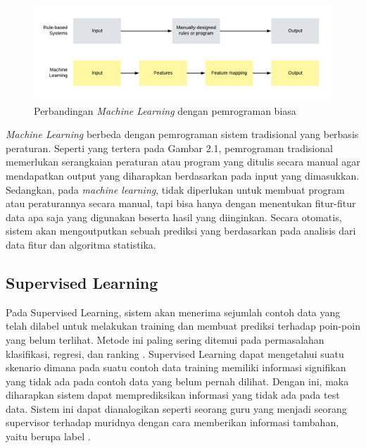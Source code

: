 \begin{figure}[H]
	\centering
	
	\includegraphics[width=\textwidth]{gambar/tipus_gambar_machine learning1}
	
	\caption{Perbandingan \emph{Machine Learning} dengan pemrograman biasa}
	\label{fig:machinelearning}
\end{figure}

\emph{Machine Learning} berbeda dengan pemrograman sistem tradisional yang berbasis peraturan. Seperti yang tertera pada Gambar 2.1, pemrograman tradisional memerlukan serangkaian peraturan atau program yang ditulis secara manual agar mendapatkan output yang diharapkan berdasarkan pada input yang dimasukkan. Sedangkan, pada \emph{machine learning}, tidak diperlukan untuk membuat program atau peraturannya secara manual, tapi bisa hanya dengan menentukan fitur-fitur data apa saja yang digunakan beserta hasil yang diinginkan. Secara otomatis, sistem akan mengoutputkan sebuah prediksi yang berdasarkan pada analisis dari data fitur dan algoritma statistika.

\subsection{Supervised Learning}
\label{sec:supervisedlearning}
Pada Supervised Learning, sistem akan menerima sejumlah contoh data yang telah dilabel untuk melakukan training dan membuat prediksi terhadap poin-poin yang belum terlihat. Metode ini paling sering ditemui pada permasalahan klasifikasi, regresi, dan ranking \citep{mohri2012foundations}. Supervised Learning dapat mengetahui suatu skenario dimana pada suatu contoh data training memiliki informasi signifikan yang tidak ada pada contoh data yang belum pernah dilihat. Dengan ini, maka diharapkan sistem dapat memprediksikan informasi yang tidak ada pada test data. Sistem ini dapat dianalogikan seperti seorang guru yang menjadi seorang supervisor terhadap muridnya dengan cara memberikan informasi tambahan, yaitu berupa label \citep{shalev2014understanding}.

